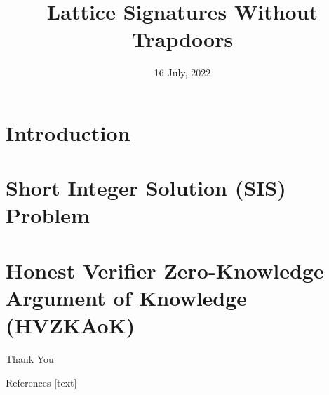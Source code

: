 \documentclass{beamer}
\title{Lattice Signatures Without Trapdoors}
\author{}
\date{16 July, 2022}
\begin{document}
	
	\begin{frame}
		\titlepage
	\end{frame}
	
	\begin{frame}{}
		\tableofcontents
		
	\end{frame}
	
	\section{Introduction} 
	
	\section{Short Integer Solution (SIS) Problem}
	
	\section{Honest Verifier Zero-Knowledge Argument of Knowledge (HVZKAoK)}
	
	\begin{frame}{}
		\begin{center}
			{\fontsize{20}{20}\selectfont Thank You}
		\end{center}
	\end{frame}

	\begin{frame}[allowframebreaks]{References}
		
		
		
	\end{frame}
	
\end{document}
